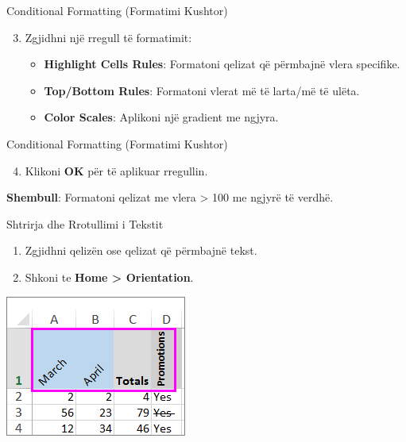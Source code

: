 \documentclass[
  ignorenonframetext,
]{beamer}
\providecommand{\tightlist}{%
  \setlength{\itemsep}{0pt}\setlength{\parskip}{0pt}}
\begin{document}
\begin{frame}{Conditional Formatting (Formatimi Kushtor)}
\label{conditional-formatting-formatimi-kushtor-1}
\begin{enumerate}
\setcounter{enumi}{2}
\item
  Zgjidhni një rregull të formatimit:

  \begin{itemize}
  \item
    \textbf{Highlight Cells Rules}: Formatoni qelizat që përmbajnë vlera
    specifike.
  \item
    \textbf{Top/Bottom Rules}: Formatoni vlerat më të larta/më të ulëta.
  \item
    \textbf{Color Scales}: Aplikoni një gradient me ngjyra.
  \end{itemize}
\end{enumerate}
\end{frame}

\begin{frame}{Conditional Formatting (Formatimi Kushtor)}
\label{conditional-formatting-formatimi-kushtor-2}
\begin{enumerate}
\setcounter{enumi}{3}
\tightlist
\item
  Klikoni \textbf{OK} për të aplikuar rregullin.
\end{enumerate}

\textbf{Shembull}: Formatoni qelizat me vlera \textgreater{} 100 me
ngjyrë të verdhë.
\end{frame}

\begin{frame}{Shtrirja dhe Rrotullimi i Tekstit}
\label{shtrirja-dhe-rrotullimi-i-tekstit}
\begin{enumerate}
\item
  Zgjidhni qelizën ose qelizat që përmbajnë tekst.
\item
  Shkoni te \textbf{Home \textgreater{} Orientation}.
\end{enumerate}

\includegraphics{./images/excel12.png}
\end{frame}
\end{document}
